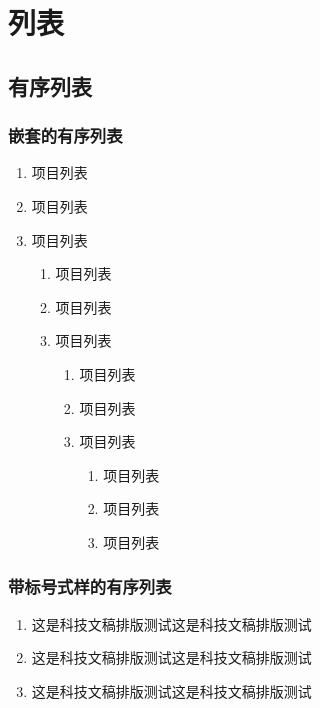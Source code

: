 
\newcommand{\aaa}{这是科技文稿排版测试这是科技文稿排版测试}

\chapter{列表 \label{chap4:liebiao}}
\section{有序列表 \label{chap4:chap1:bianhao}}
\subsection{嵌套的有序列表}
\begin{enumerate}
    \item {项目列表}
    \item {项目列表}
    \item {项目列表}
    \begin{enumerate}
        \item {项目列表}
        \item {项目列表}
        \item {项目列表}
        \begin{enumerate}
            \item {项目列表}
            \item {项目列表}
            \item {项目列表}
            \begin{enumerate}
            \item {项目列表}
            \item {项目列表}
            \item {项目列表}
            \end{enumerate}
        \end{enumerate}
    \end{enumerate}
\end{enumerate}

\subsection{带标号式样的有序列表}
\begin{enumerate}[{A}-i]
    \item \aaa
    \item \aaa
    \item \aaa
\end{enumerate}

